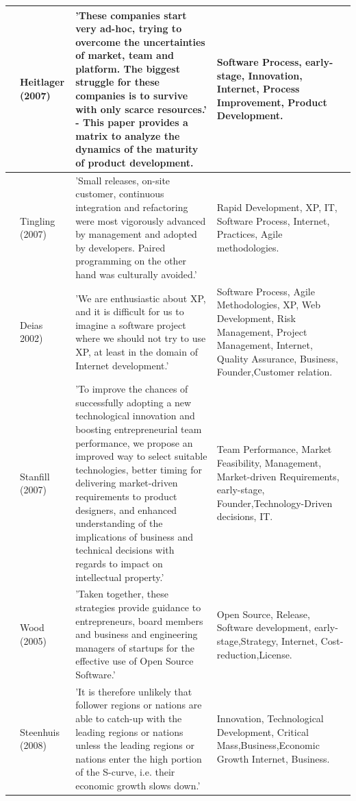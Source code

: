 \documentclass[final,5p,times,twocolumn]{elsarticle}
\begin{document}
\begin{longtable}{|p{0.2in}|p{0.8in}|p{2.5in}|p{1.4in}|}
\cite{Heitlager2007} & Heitlager (2007) & 'These companies start very ad-hoc, trying to overcome the uncertainties of market, team and platform. The biggest struggle for these companies is to survive with only scarce resources.' - This paper provides a matrix to analyze the dynamics of the maturity of product development. & Software Process,  early-stage, Innovation, Internet, Process Improvement, Product Development. \\ \hline 
\cite{Tingling2007} & Tingling (2007) & 'Small releases, on-site customer, continuous integration and refactoring were most vigorously advanced by management and adopted by developers. Paired programming on the other hand was culturally avoided.' & Rapid Development, XP, IT, Software Process, Internet, Practices, Agile methodologies. \\ \hline 
\cite{Deias} & Deias  2002) & 'We are enthusiastic about XP, and it is difficult for us to imagine a software project where we should not try to use XP, at least in the domain of Internet development.' & Software Process, Agile Methodologies, XP, Web Development, Risk Management, Project Management, Internet, Quality Assurance, Business, Founder,Customer relation. \\ \hline 
\cite{Stanfill2007} & Stanfill (2007) & 'To improve the chances of successfully adopting a new technological innovation and boosting entrepreneurial team performance, we propose an improved way to select suitable technologies, better timing for delivering market-driven requirements to product designers, and enhanced understanding of the implications of business and technical decisions with regards to impact on intellectual property.' & Team Performance, Market Feasibility, Management, Market-driven Requirements,  early-stage, Founder,Technology-Driven decisions, IT.\\ \hline 
\cite{Wood2005} & Wood (2005) & 'Taken together, these strategies provide guidance to entrepreneurs, board members and business and engineering managers of startups for the effective use of Open Source Software.' & Open Source, Release, Software development,  early-stage,Strategy, Internet,  Cost-reduction,License. \\ \hline 
\cite{Steenhuis2008} & Steenhuis (2008) & 'It is therefore unlikely that follower regions or nations are able to catch-up with the leading regions or nations unless the leading regions or nations enter the high portion of the S-curve, i.e. their economic growth slows down.' & Innovation, Technological Development, Critical Mass,Business,Economic Growth Internet, Business. \\ \hline 

\end{longtable}
\end{document}
